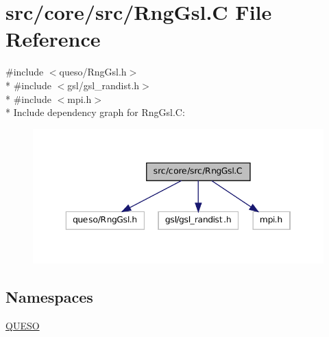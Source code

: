 \hypertarget{_rng_gsl_8_c}{\section{src/core/src/\-Rng\-Gsl.C File Reference}
\label{_rng_gsl_8_c}
}
{\ttfamily \#include $<$queso/\-Rng\-Gsl.\-h$>$}\\*
{\ttfamily \#include $<$gsl/gsl\-\_\-randist.\-h$>$}\\*
{\ttfamily \#include $<$mpi.\-h$>$}\\*
Include dependency graph for Rng\-Gsl.\-C\-:
\nopagebreak
\begin{figure}[H]
\begin{center}
\leavevmode
\includegraphics[width=346pt]{_rng_gsl_8_c__incl}
\end{center}
\end{figure}
\subsection*{Namespaces}
\begin{DoxyCompactItemize}
\item 
\hyperlink{namespace_q_u_e_s_o}{Q\-U\-E\-S\-O}
\end{DoxyCompactItemize}
